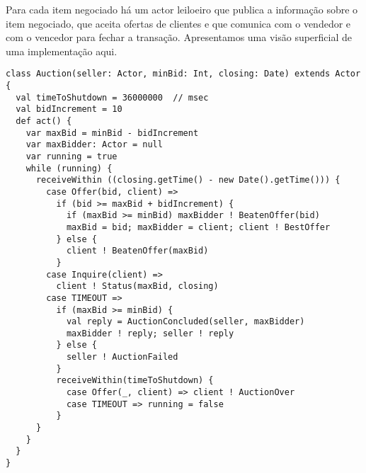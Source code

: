 Para cada item negociado há um actor leiloeiro que publica a 
informação sobre o item negociado, que aceita ofertas de clientes
e que comunica com o vendedor e com o vencedor para fechar a transação.
Apresentamos uma visão superficial de uma implementação aqui.


\begin{lstlisting}[style=floating,label=fig:simple-auction,caption=Implementation of an Auction Service]
class Auction(seller: Actor, minBid: Int, closing: Date) extends Actor {
  val timeToShutdown = 36000000  // msec
  val bidIncrement = 10
  def act() {
    var maxBid = minBid - bidIncrement
    var maxBidder: Actor = null
    var running = true
    while (running) {
      receiveWithin ((closing.getTime() - new Date().getTime())) {
        case Offer(bid, client) =>
          if (bid >= maxBid + bidIncrement) { 
            if (maxBid >= minBid) maxBidder ! BeatenOffer(bid)
            maxBid = bid; maxBidder = client; client ! BestOffer
          } else {
            client ! BeatenOffer(maxBid)
          }
        case Inquire(client) =>
          client ! Status(maxBid, closing)
        case TIMEOUT =>
          if (maxBid >= minBid) {
            val reply = AuctionConcluded(seller, maxBidder)
            maxBidder ! reply; seller ! reply
          } else {
            seller ! AuctionFailed
          }
          receiveWithin(timeToShutdown) {
            case Offer(_, client) => client ! AuctionOver
            case TIMEOUT => running = false
          }
      }
    }
  } 
}
\end{lstlisting}


